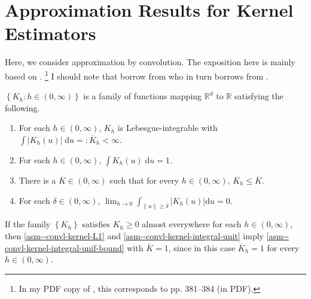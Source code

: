 
\section{Approximation Results for Kernel Estimators}

Here, we consider approximation by convolution.
The exposition here is mainly based on
\citet[pp. 362--365]{1999paganNonparametricEconometrics}.%
\footnote{In my PDF copy of \citet{1999paganNonparametricEconometrics}, this
corresponds to pp. 381--384 (in PDF).}
I should note that \citet{1999paganNonparametricEconometrics} borrow from
\citet{1962parzenEstimationProbabilityDensity} who in turn borrows from
\citet{1955bochnerHarmonicAnalysisTheory}.

\begin{assumption}
\label{asm--convl-kernel}
\(\left\{ K_{h} : h \in (0, \infty) \right\}\) is a family of
functions mapping \(\mathbb{R}^{d}\) to \(\mathbb{R}\)
satisfying the following.
\begin{enumerate}[label=(\roman*)]
  \item \label{asm--convl-kernel-L1}
    For each \(h \in (0, \infty)\), \(K_{h}\) is Lebesgue-integrable with
    \(\int \left| K_{h} (u) \right| \; \mathrm{d} u =: \overline{K}_{h} <
    \infty\).
  \item \label{asm--convl-kernel-integral-unit}
    For each \(h \in (0, \infty)\), \(\int K_{h} (u) \; \mathrm{d} u = 1\).
  \item \label{asm--convl-kernel-integral-unif-bound}
    There is a \(\overline{K} \in (0, \infty)\) such that for every \(h \in (0,
    \infty)\), \(\overline{K}_{h} \leq \overline{K}\).
  \item \label{asm--convl-kernel-convl-prob}
    For each \(\delta \in (0, \infty)\), \(\lim_{h \to 0} \int_{\|u\| \geq
    \delta} \left| K_{h} (u) \right| \mathrm{d} u = 0\).
\end{enumerate}
\end{assumption}

\begin{remark}
If the family \(\left\{ K_{h} \right\}\) satisfies \(K_{h} \geq 0\) almost
everywhere for each \(h \in (0, \infty)\), then 
\ref{asm--convl-kernel-L1} and \ref{asm--convl-kernel-integral-unit} imply
\ref{asm--convl-kernel-integral-unif-bound} with \(\overline{K} = 1\), since in
this case \(\overline{K}_{h} = 1\) for every \(h \in (0, \infty)\).
\end{remark}

